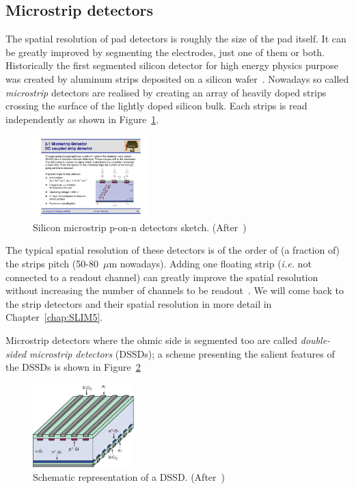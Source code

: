 \subsection{Microstrip detectors}
\label{sec:microstrips}
The spatial resolution of pad detectors is roughly the size of the pad itself.
 It can be greatly improved by segmenting the electrodes, just one of 
them or both. 
  Historically the first segmented silicon detector for high energy physics purpose was created by 
 aluminum strips deposited on a silicon wafer~\cite{Amendolia}. 
Nowadays so called {\it microstrip} detectors are realised by creating an array of heavily doped 
strips crossing the surface 
 of the lightly doped silicon bulk. Each strips is read independently as shown in Figure~\ref{fig:strips}.
 
 \begin{figure}[htbp]
   \centering
   \includegraphics[width=0.4\textwidth]{Strips.pdf} 
      \caption{\label{fig:strips} Silicon microstrip p-on-n detectors sketch. (After~\cite{Krammer})}
\end{figure}
 
 The typical spatial resolution of these detectors is of the order of (a fraction of) the strips pitch 
 (50-80~$\mu$m nowadays).
 Adding one floating strip ({\it i.e.} not connected to a readout channel) can greatly 
 improve the spatial resolution without increasing the number of channels to be 
 readout~\cite{TURCHETTA}. We will come back to the strip detectors and their spatial resolution in 
 more detail in 
 Chapter~\ref{chap:SLIM5}.
 
 Microstrip detectors where  the ohmic side is segmented too  are called {\it double-sided microstrip 
 detectors} (DSSDs); a scheme presenting the salient features of the DSSDs is shown in 
 Figure~\ref{fig:DSSD}
  \begin{figure}[htbp]
   \centering
   \includegraphics[width=0.35\textwidth]{DSSD.pdf} 
      \caption{\label{fig:DSSD} Schematic representation of a DSSD. (After~\cite{Krammer})}
\end{figure}

